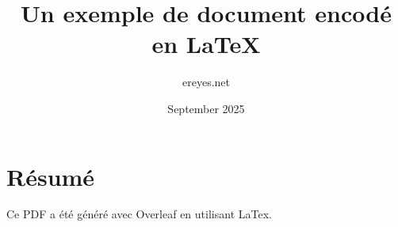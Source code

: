 \documentclass{article}
\title{Un exemple de document encodé en LaTeX}
\author{ereyes.net}
\date{September 2025}
\begin{document}
\maketitle

\section{Résumé}

Ce PDF a été généré avec Overleaf en utilisant LaTex.
\end{document}
